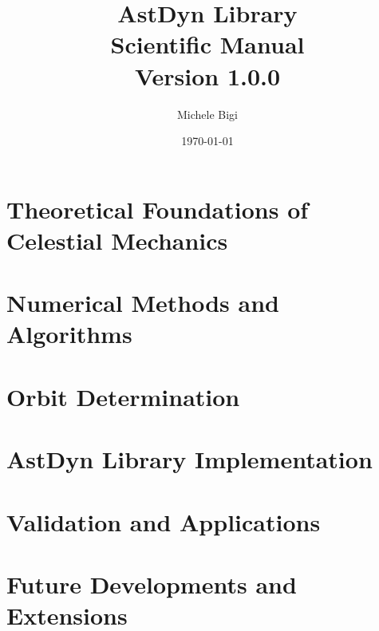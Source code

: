 \documentclass[12pt,a4paper,twoside]{book}
\title{%
    \Huge\textbf{AstDyn Library}\\[0.5cm]
    \Large Scientific Manual\\[0.3cm]
    \large Version 1.0.0
}
\author{Michele Bigi}
\date{\today}
\theoremstyle{definition}
\theoremstyle{plain}
\theoremstyle{remark}
\begin{document}
\frontmatter




\tableofcontents
\listoffigures
\listoftables

\mainmatter

\part{Theoretical Foundations of Celestial Mechanics}








\part{Numerical Methods and Algorithms}





\part{Orbit Determination}





\part{AstDyn Library Implementation}







\part{Validation and Applications}






\part{Future Developments and Extensions}


\backmatter

\appendix


\end{document}
